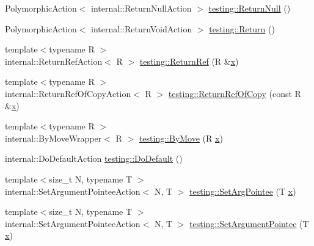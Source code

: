 \begin{DoxyCompactItemize}
\item 
Polymorphic\+Action$<$ internal\+::\+Return\+Null\+Action $>$ \mbox{\hyperlink{namespacetesting_af05e07c0484961f2a30ba44d1d1816fe}{testing\+::\+Return\+Null}} ()
\item 
Polymorphic\+Action$<$ internal\+::\+Return\+Void\+Action $>$ \mbox{\hyperlink{namespacetesting_a492ba67db1dfe5dc8257b6e3d38b8183}{testing\+::\+Return}} ()
\item 
{\footnotesize template$<$typename R $>$ }\\internal\+::\+Return\+Ref\+Action$<$ R $>$ \mbox{\hyperlink{namespacetesting_ac17089d5ca6377944d3792fbdc5c5d9b}{testing\+::\+Return\+Ref}} (R \&\mbox{\hyperlink{_obj__test_2lib_2googletest-master_2googlemock_2test_2gmock-matchers__test_8cc_a6150e0515f7202e2fb518f7206ed97dc}{x}})
\item 
{\footnotesize template$<$typename R $>$ }\\internal\+::\+Return\+Ref\+Of\+Copy\+Action$<$ R $>$ \mbox{\hyperlink{namespacetesting_ab84f2bf2f22aa75d8b52887bfc7d218c}{testing\+::\+Return\+Ref\+Of\+Copy}} (const R \&\mbox{\hyperlink{_obj__test_2lib_2googletest-master_2googlemock_2test_2gmock-matchers__test_8cc_a6150e0515f7202e2fb518f7206ed97dc}{x}})
\item 
{\footnotesize template$<$typename R $>$ }\\internal\+::\+By\+Move\+Wrapper$<$ R $>$ \mbox{\hyperlink{namespacetesting_a38293837852ef2c406b063741018d108}{testing\+::\+By\+Move}} (R \mbox{\hyperlink{_obj__test_2lib_2googletest-master_2googlemock_2test_2gmock-matchers__test_8cc_a6150e0515f7202e2fb518f7206ed97dc}{x}})
\item 
internal\+::\+Do\+Default\+Action \mbox{\hyperlink{namespacetesting_ae041df61ff61ccb9753ba15b4309e1a6}{testing\+::\+Do\+Default}} ()
\item 
{\footnotesize template$<$size\+\_\+t N, typename T $>$ }\\internal\+::\+Set\+Argument\+Pointee\+Action$<$ N, T $>$ \mbox{\hyperlink{namespacetesting_a6dbe77dc170c495ea300dd9d74ed4595}{testing\+::\+Set\+Arg\+Pointee}} (T \mbox{\hyperlink{_obj__test_2lib_2googletest-master_2googlemock_2test_2gmock-matchers__test_8cc_a6150e0515f7202e2fb518f7206ed97dc}{x}})
\item 
{\footnotesize template$<$size\+\_\+t N, typename T $>$ }\\internal\+::\+Set\+Argument\+Pointee\+Action$<$ N, T $>$ \mbox{\hyperlink{namespacetesting_a470bcfec000440453700ee7a4e301874}{testing\+::\+Set\+Argument\+Pointee}} (T \mbox{\hyperlink{_obj__test_2lib_2googletest-master_2googlemock_2test_2gmock-matchers__test_8cc_a6150e0515f7202e2fb518f7206ed97dc}{x}})

\end{DoxyCompactItemize}
